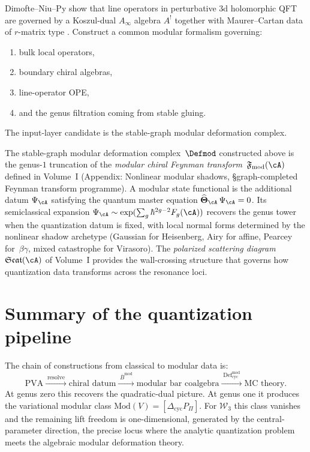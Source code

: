 \begin{question}
Dimofte--Niu--Py show that line operators in perturbative 3d holomorphic QFT are governed
by a Koszul-dual $A_\infty$ algebra $A^!$ together with Maurer--Cartan data of $r$-matrix
type \cite{DNP25}. Construct a common modular formalism governing:
\begin{enumerate}[leftmargin=2.4em]
\item bulk local operators,
\item boundary chiral algebras,
\item line-operator OPE,
\item and the genus filtration coming from stable gluing.
\end{enumerate}
The input-layer candidate is the stable-graph modular deformation complex.
\end{question}

\begin{remark}
\label{rem:modular-state-functional-connection}
The stable-graph modular deformation complex~$\Defmod$ constructed above
is the genus-$1$ truncation of the \emph{modular chiral Feynman
transform}~$\mathfrak{F}_{\mathrm{mod}}(\cA)$ defined in
Volume~I (Appendix: Nonlinear modular shadows,
\S\textup{graph-completed Feynman transform programme}).
A modular state functional is the additional datum
$\Psi_\cA$ satisfying the quantum master equation
$\widehat{\boldsymbol\Theta}_\cA\,\Psi_\cA=0$. Its semiclassical
expansion
$\Psi_\cA \sim \exp(\sum_{g} \hbar^{2g-2} F_g(\cA))$
recovers the genus tower when the quantization datum is fixed, with local
normal forms determined by the nonlinear shadow archetype (Gaussian for
Heisenberg, Airy for affine, Pearcey for~$\beta\gamma$, mixed catastrophe
for Virasoro).
The \emph{polarized scattering diagram}~$\mathfrak{Scat}(\cA)$ of
Volume~I provides the wall-crossing structure that governs how
quantization data transforms across the resonance loci.
\end{remark}

\section*{Summary of the quantization pipeline}

The chain of constructions from classical to modular data is:
\[
\text{PVA}
\xrightarrow{\;\text{resolve}\;}
\text{chiral datum}
\xrightarrow{\;\overline{B}^{\mathrm{mod}}\;}
\text{modular bar coalgebra}
\xrightarrow{\;\mathrm{Def}_{\mathrm{cyc}}^{\mathrm{mod}}\;}
\text{MC theory}.
\]
At genus zero this recovers the quadratic-dual picture. At genus one it produces the
variational modular class $\mathrm{Mod}(V) = [\Delta_{\mathrm{cyc}} P_\Pi]$.
For $\mathcal{W}_3$ this class vanishes and the remaining lift freedom is one-dimensional,
generated by the central-parameter direction, the precise locus where the analytic
quantization problem meets the algebraic modular deformation theory.

